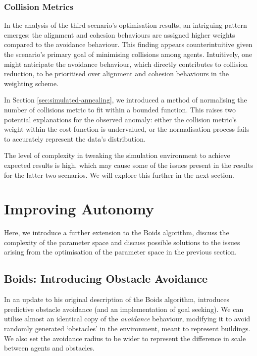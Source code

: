 \documentclass[12pt]{article}
\begin{document}
\subsubsection{Collision Metrics}
In the analysis of the third scenario's optimisation results, an intriguing pattern emerges: the alignment and cohesion behaviours are assigned higher weights compared to the avoidance behaviour. This finding appears counterintuitive given the scenario's primary goal of minimising collisions among agents. Intuitively, one might anticipate the avoidance behaviour, which directly contributes to collision reduction, to be prioritised over alignment and cohesion behaviours in the weighting scheme.

In Section \ref{sec:simulated-annealing}, we introduced a method of normalising the number of collisions metric to fit within a bounded function. This raises two potential explanations for the observed anomaly: either the collision metric's weight within the cost function is undervalued, or the normalisation process fails to accurately represent the data's distribution.

The level of complexity in tweaking the simulation environment to achieve expected results is high, which may cause some of the issues present in the results for the latter two scenarios. We will explore this further in the next section.

\newpage
\section{Improving Autonomy}
Here, we introduce a further extension to the Boids algorithm, discuss the complexity of the parameter space and discuss possible solutions to the issues arising from the optimisation of the parameter space in the previous section.

\subsection{Boids: Introducing Obstacle Avoidance}
In an update to his original description of the Boids algorithm, \citet{boids95} introduces predictive obstacle avoidance (and an implementation of goal seeking). We can utilise almost an identical copy of the \emph{avoidance} behaviour, modifying it to avoid randomly generated `obstacles' in the environment, meant to represent buildings. We also set the avoidance radius to be wider to represent the difference in scale between agents and obstacles.
\end{document}
